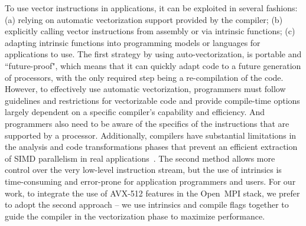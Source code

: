 \documentclass[5p,times,twocolumn]{elsarticle}
\newcommand{\ompi}[0]{Open~MPI\xspace}
\begin{document}
To use vector instructions in applications, it can be exploited in several fashions:
(a) relying on automatic vectorization support provided by the compiler;
(b) explicitly calling vector instructions from assembly or via intrinsic functions;
(c) adapting intrinsic functions into programming models or languages
for applications to use.
%
The first strategy by using auto-vectorization, is portable and
``future-proof", which means that it can quickly adapt code to a future
generation of processors, with the only required step being a
re-compilation of the code. However, to effectively use automatic
vectorization, programmers must follow guidelines and restrictions for
vectorizable code and provide compile-time options largely dependent
on a specific compiler's capability and efficiency.
%
And programmers also need to be aware of the specifics of the
instructions that are supported by a processor.  Additionally,
compilers have substantial limitations in the analysis and code
transformations phases that prevent an efficient extraction of SIMD
parallelism in real applications~\cite{autoEvaluation}.
%
The second method allows more control over the very low-level
instruction stream, but the use of intrinsics is time-consuming and
error-prone for application programmers and users.
%
For our work, to integrate the use of AVX-512 features in the \ompi
stack, we prefer to adopt the second approach -- we use intrinsics and
compile flags together to guide the compiler in the vectorization
phase to maximize performance.
\end{document}
